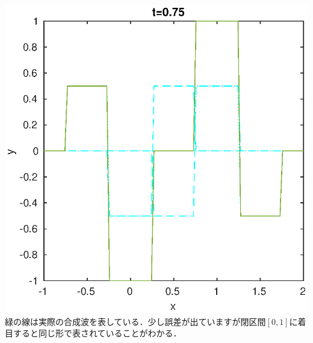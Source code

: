 \documentclass{jreport}
\begin{document}
\includegraphics[scale=0.3]{275.eps}\\

緑の線は実際の合成波を表している．少し誤差が出ていますが閉区間$[0,1]$に着目すると同じ形で表されていることがわかる．
\end{document}
